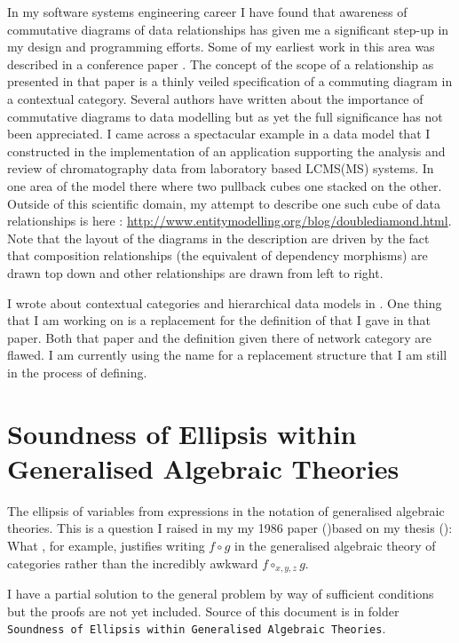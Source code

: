 \documentclass[10pt,a4paper]{article}
\theoremstyle{remark}
\newcommand {\myfirstpaper}{my 1986 paper (\cite{Cartmell86})based on my thesis (\cite{Cartmell78})}
\begin{document}
\note 
In my software systems engineering  career I have found that awareness of  commutative diagrams of data relationships 
has given me a significant step-up in my design and programming efforts. 
Some of my earliest work in this area was described in a conference paper  \cite{CartmellScopePaper}. 
The concept of the scope of a relationship as presented in that paper is a thinly veiled
specification of a commuting diagram in a contextual category. 
Several authors have written about the importance of commutative diagrams to data modelling but 
as yet the full significance has not been appreciated. I came across a spectacular example in a data model that I constructed 
in the implementation of an application supporting the analysis and review of chromatography data from laboratory based LCMS(MS) systems.
In one area of the model there where two pullback cubes one stacked on the other. Outside of this scientific domain, my attempt to describe one such cube  of data relationships
is here : \url{http://www.entitymodelling.org/blog/doublediamond.html}. Note that the layout of the diagrams in the description are driven by the fact that composition relationships (the equivalent of dependency morphisms) are drawn top down and other relationships are drawn from left to right.

\note
I wrote about contextual categories and hierarchical data models in \cite{CartmellNetworkDataModel}.
One thing that I am working on  is a replacement for the definition 
 of  that I gave in that paper. Both that paper and the definition given there of network category are flawed.
I am currently using the name  for a replacement structure that I am still in the process of defining.

\section{Soundness of Ellipsis within Generalised Algebraic Theories}
\note
The ellipsis of variables from expressions in the notation of generalised algebraic theories. 
This is a question I raised in my \myfirstpaper :
What , for example, justifies writing $f \circ g$ in the generalised algebraic theory of categories rather than the incredibly awkward $f \circ_{x,y,z} g$. 

I have a partial solution to the general problem by way of sufficient conditions but the proofs are not yet included. 
Source of this 
document is in folder {\small \texttt{Soundness of Ellipsis within Generalised Algebraic Theories}}.
\end{document}
